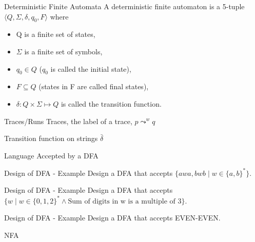 \documentclass{beamer}
\begin{document}
\begin{frame}{Deterministic Finite Automata}
A deterministic finite automaton is a 5-tuple $\langle Q, \Sigma, \delta, q_0, F\rangle$ where
\begin{itemize}
  \item Q is a finite set of states,
  \item $\Sigma$ is a finite set of symbols,
  \item $q_0\in Q$ ($q_0$ is called the initial state),
  \item $F\subseteq Q$ (states in F are called final states),
  \item $\delta:Q\times \Sigma\mapsto Q$ is called the transition function. 
\end{itemize}

\end{frame}

\begin{frame}{Traces/Runs}
Traces, the label of a trace, 
$p\leadsto^{w} q$ 

\end{frame}

\begin{frame}{Transition function on strings $\bar{\delta}$}

\end{frame}

\begin{frame}{Language Accepted by a DFA}

\end{frame}

\begin{frame}{Design of DFA - Example} 
Design a DFA that accepts $\{awa,bwb\mid w\in\{a,b\}^*\}$. 

\end{frame}

\begin{frame}{Design of DFA - Example}
Design a DFA that accepts $\{w\mid w\in \{0,1,2\}^*\wedge \mbox{Sum of digits in w is a multiple of 3}\}$. 

\end{frame}

\begin{frame}{Design of DFA - Example} 
Design a DFA that accepts EVEN-EVEN. 

\end{frame}


\begin{frame}{NFA}

\end{frame}
\end{document}
